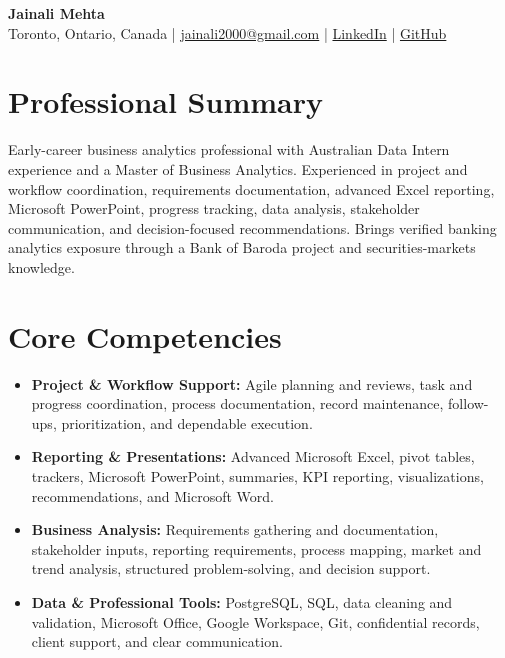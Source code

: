 \documentclass[letterpaper,10pt]{article}
\begin{document}
\begin{center}
  {\fontsize{17}{19}\selectfont\textbf{Jainali Mehta}}\\[2pt]
  \small Toronto, Ontario, Canada \;|\;
  \href{mailto:jainali2000@gmail.com}{jainali2000@gmail.com} \;|\;
  \href{https://www.linkedin.com/in/jainali-mehta}{LinkedIn} \;|\;
  \href{https://github.com/jainalimehta}{GitHub}
\end{center}
\vspace{-7pt}

\section{Professional Summary}
\small Early-career business analytics professional with Australian Data Intern experience and a Master of Business Analytics. Experienced in project and workflow coordination, requirements documentation, advanced Excel reporting, Microsoft PowerPoint, progress tracking, data analysis, stakeholder communication, and decision-focused recommendations. Brings verified banking analytics exposure through a Bank of Baroda project and securities-markets knowledge.

\section{Core Competencies}
\begin{itemize}[leftmargin=0.16in,label=\textbullet,topsep=0pt,itemsep=1pt,parsep=0pt]
  \item \small \textbf{Project \& Workflow Support:} Agile planning and reviews, task and progress coordination, process documentation, record maintenance, follow-ups, prioritization, and dependable execution.
  \item \small \textbf{Reporting \& Presentations:} Advanced Microsoft Excel, pivot tables, trackers, Microsoft PowerPoint, summaries, KPI reporting, visualizations, recommendations, and Microsoft Word.
  \item \small \textbf{Business Analysis:} Requirements gathering and documentation, stakeholder inputs, reporting requirements, process mapping, market and trend analysis, structured problem-solving, and decision support.
  \item \small \textbf{Data \& Professional Tools:} PostgreSQL, SQL, data cleaning and validation, Microsoft Office, Google Workspace, Git, confidential records, client support, and clear communication.
\end{itemize}
\end{document}
